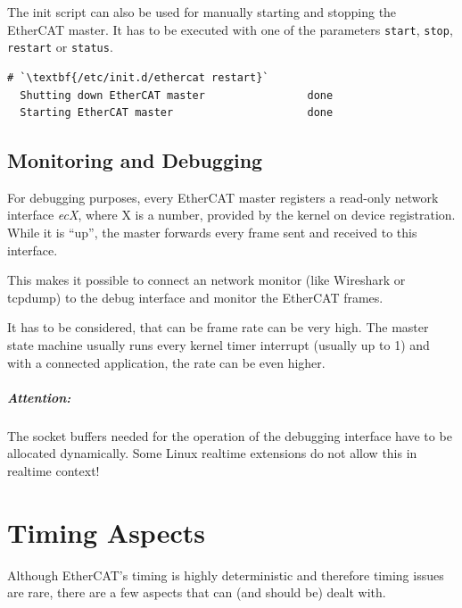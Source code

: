 \documentclass[a4paper,12pt,BCOR6mm,bibtotoc,idxtotoc]{scrbook}
\begin{document}
The init script can also be used for manually starting and stopping
the EtherCAT master. It has to be executed with one of the parameters
\texttt{start}, \texttt{stop}, \texttt{restart} or \texttt{status}.

\begin{lstlisting}[gobble=2]
  # `\textbf{/etc/init.d/ethercat restart}`
  Shutting down EtherCAT master                done
  Starting EtherCAT master                     done
\end{lstlisting}


\section{Monitoring and Debugging}
\label{sec:debug}

For debugging purposes, every EtherCAT master registers a read-only network
interface \textit{ecX}, where X is a number, provided by the kernel on device
registration. While it is ``up'', the master forwards every frame sent and
received to this interface.

This makes it possible to connect an network monitor (like Wireshark or
tcpdump) to the debug interface and monitor the EtherCAT frames.

It has to be considered, that can be frame rate can be very high. The master
state machine usually runs every kernel timer interrupt (usually up to
\unit{1}{\kilo\hertz}) and with a connected application, the rate can be even
higher.

\paragraph{Attention:} The socket buffers needed for the operation of
the debugging interface have to be allocated dynamically. Some Linux
realtime extensions do not allow this in realtime context!


\chapter{Timing Aspects}
\label{sec:timing}

Although EtherCAT's timing is highly deterministic and therefore timing issues
are rare, there are a few aspects that can (and should be) dealt with.
\end{document}
